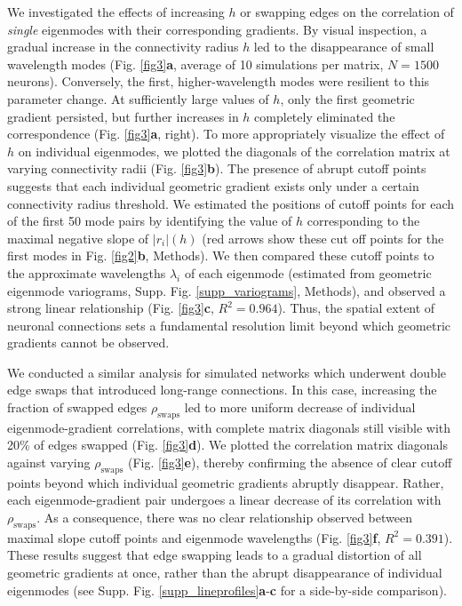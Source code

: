 \documentclass{article}
\begin{document}
We investigated the effects of increasing $h$ or swapping edges on the correlation of \emph{single} eigenmodes with their corresponding gradients. By visual inspection, a gradual increase in the connectivity radius $h$ led to the disappearance of small wavelength modes (Fig. \ref{fig3}\textbf{a}, average of 10 simulations per matrix, $N=1500$ neurons). Conversely, the first, higher-wavelength modes were resilient to this parameter change. At sufficiently large values of $h$, only the first geometric gradient persisted, but further increases in $h$ completely eliminated the correspondence (Fig. \ref{fig3}\textbf{a}, right). To more appropriately visualize the effect of $h$ on individual eigenmodes, we plotted the diagonals of the correlation matrix at varying connectivity radii (Fig. \ref{fig3}\textbf{b}). The presence of abrupt cutoff points suggests that each individual geometric gradient exists only under a certain connectivity radius threshold. We estimated the positions of cutoff points for each of the first 50 mode pairs by identifying the value of $h$ corresponding to the maximal negative slope of $|r_i|(h)$ (red arrows show these cut off points for the first modes in Fig. \ref{fig2}\textbf{b}, Methods). We then compared these cutoff points to the approximate wavelengths $\lambda_i$ of each eigenmode (estimated from geometric eigenmode variograms, Supp. Fig. \ref{supp_variograms}, Methods), and observed a strong linear relationship (Fig. \ref{fig3}\textbf{c}, $R^2=0.964$). Thus, the spatial extent of neuronal connections sets a fundamental resolution limit beyond which geometric gradients cannot be observed.

We conducted a similar analysis for simulated networks which underwent double edge swaps that introduced long-range connections. In this case, increasing the fraction of swapped edges $\rho_{\text{swaps}}$ led to more uniform decrease of individual eigenmode-gradient correlations, with complete matrix diagonals still visible with 20\% of edges swapped (Fig. \ref{fig3}\textbf{d}). We plotted the correlation matrix diagonals against varying $\rho_{\text{swaps}}$ (Fig. \ref{fig3}\textbf{e}), thereby confirming the absence of clear cutoff points beyond which individual geometric gradients abruptly disappear. Rather, each eigenmode-gradient pair undergoes a linear decrease of its correlation with $\rho_{\text{swaps}}$. As a consequence, there was no clear relationship observed between maximal slope cutoff points and eigenmode wavelengths (Fig. \ref{fig3}\textbf{f}, $R^2=0.391$). These results suggest that edge swapping leads to a gradual distortion of all geometric gradients at once, rather than the abrupt disappearance of individual eigenmodes (see Supp. Fig. \ref{supp_lineprofiles}\textbf{a}-\textbf{c} for a side-by-side comparison).
\end{document}
